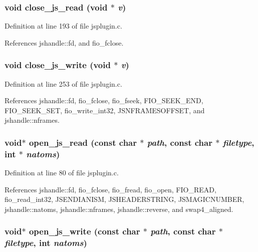 \subsubsection{\setlength{\rightskip}{0pt plus 5cm}void close\_\-js\_\-read (void $\ast$ {\em v})\hspace{0.3cm}{\tt  [static]}}\label{jsplugin_8c_a13}




Definition at line 193 of file jsplugin.c.

References jshandle::fd, and fio\_\-fclose.
\subsubsection{\setlength{\rightskip}{0pt plus 5cm}void close\_\-js\_\-write (void $\ast$ {\em v})\hspace{0.3cm}{\tt  [static]}}\label{jsplugin_8c_a16}




Definition at line 253 of file jsplugin.c.

References jshandle::fd, fio\_\-fclose, fio\_\-fseek, FIO\_\-SEEK\_\-END, FIO\_\-SEEK\_\-SET, fio\_\-write\_\-int32, JSNFRAMESOFFSET, and jshandle::nframes.
\subsubsection{\setlength{\rightskip}{0pt plus 5cm}void$\ast$ open\_\-js\_\-read (const char $\ast$ {\em path}, const char $\ast$ {\em filetype}, int $\ast$ {\em natoms})\hspace{0.3cm}{\tt  [static]}}\label{jsplugin_8c_a11}




Definition at line 80 of file jsplugin.c.

References jshandle::fd, fio\_\-fclose, fio\_\-fread, fio\_\-open, FIO\_\-READ, fio\_\-read\_\-int32, JSENDIANISM, JSHEADERSTRING, JSMAGICNUMBER, jshandle::natoms, jshandle::nframes, jshandle::reverse, and swap4\_\-aligned.
\subsubsection{\setlength{\rightskip}{0pt plus 5cm}void$\ast$ open\_\-js\_\-write (const char $\ast$ {\em path}, const char $\ast$ {\em filetype}, int {\em natoms})\hspace{0.3cm}{\tt  [static]}}\label{jsplugin_8c_a14}




